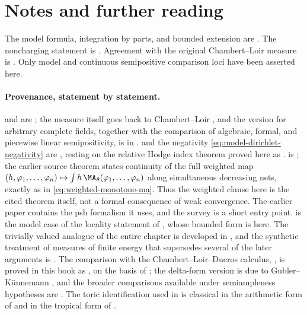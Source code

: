 \section*{Notes and further reading}

The model formula, integration by parts, and bounded extension are
\cite[Proposition--Definition~2.18, Propositions~2.19--2.21, and
Theorem~3.1]{BFJ15}. The noncharging statement is
\cite[Proposition~3.11]{BFJ15}. Agreement with the original Chambert--Loir
measure is \cite[\S3.3]{BFJ15}. Only model and continuous semipositive
comparison loci have been asserted here.

\paragraph{Provenance, statement by statement.}
 and  are
\cite[\S2.7]{BFJ15}; the measure itself goes back to Chambert--Loir
\cite{CL06}, and the version for arbitrary complete fields, together with
the comparison of algebraic, formal, and piecewise linear semipositivity, is
in \cite{GM19}.   and the negativity
\eqref{eq:model-dirichlet-negativity} are \cite[\S2]{BFJ15}, resting on the
relative Hodge index theorem proved here as .
 is \cite[Theorem~3.1]{BFJ15}; the earlier
source theorem states continuity of the full weighted map
$(h,\varphi_1,\ldots,\varphi_n)\mapsto
\int h\,\MA_\theta(\varphi_1,\ldots,\varphi_n)$ along simultaneous
decreasing nets, exactly as in \eqref{eq:weighted-monotone-ma}.  Thus the
weighted clause here is the cited theorem itself, not a formal consequence
of weak convergence.  The earlier paper \cite{BFJ16} contains the psh
formalism it uses, and the survey
\cite{BFJ16b} is a short entry point.  
is the model case of the locality statement of \cite[\S3]{BFJ15}, whose
bounded form is
 here.  The trivially valued analogue of
the entire chapter is developed in \cite{BJ22}, and the synthetic treatment of
measures of finite energy that supersedes several of the later arguments is
\cite{BJ25FiniteEnergy}.  The comparison with the Chambert--Loir--Ducros
calculus, , is proved in this book as
, on the basis of
\cite[Theorem~18.5.5 and Proposition~18.5.8]{CLD25}; the delta-form version
is due to Gubler--K\"unnemann \cite{GK17,GK19}, and the broader comparisons
available under semiampleness hypotheses are
\cite[Theorems~7.14 and~8.4]{BE21}.  The toric identification used in
 is classical in the arithmetic form of
\cite{BGPS14} and in the tropical form of \cite{BGJKK25}.

